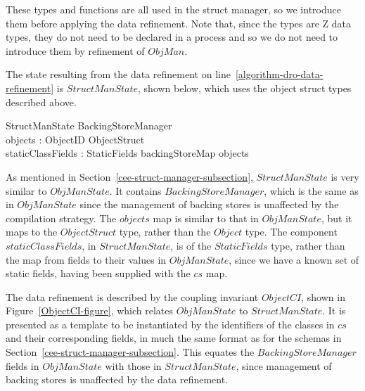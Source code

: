 These types and functions are all used in the struct manager, so we
introduce them before applying the data refinement.
Note that, since the types are Z data types, they do not need to be
declared in a process and so we do not need to introduce them by
refinement of $ObjMan$.

The state resulting from the data refinement on
line~\ref{algorithm-dro-data-refinement} is $StructManState$, shown
below, which uses the object struct types described above.
\begin{schema}{StructManState}
  BackingStoreManager \\
  objects : ObjectID \pfun ObjectStruct \\
  staticClassFields : StaticFields
\where
  backingStoreMap \partition \dom objects
\end{schema}
As mentioned in Section~\ref{cee-struct-manager-subsection},
$StructManState$ is very similar to $ObjManState$.
It contains $BackingStoreManager$, which is the same as in
$ObjManState$ since the management of backing stores is unaffected by
the compilation strategy.
The $objects$ map is similar to that in $ObjManState$, but it maps to
the $ObjectStruct$ type, rather than the $Object$ type.
The component $staticClassFields$, in $StructManState$, is of the
$StaticFields$ type, rather than the map from fields to their values
in $ObjManState$, since we have a known set of static fields, having
been supplied with the $cs$ map.

The data refinement is described by the coupling invariant $ObjectCI$,
shown in Figure~\ref{ObjectCI-figure}, which relates $ObjManState$ to
$StructManState$.
It is presented as a template to be instantiated by the identifiers of
the classes in $cs$ and their corresponding fields, in much the same
format as for the schemas in
Section~\ref{cee-struct-manager-subsection}.
This equates the $BackingStoreManager$ fields in $ObjManState$ with
those in $StructManState$, since management of backing stores is
unaffected by the data refinement.

